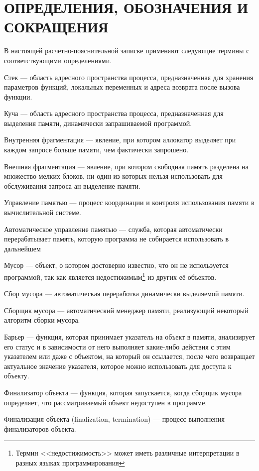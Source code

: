 \part*{ОПРЕДЕЛЕНИЯ, ОБОЗНАЧЕНИЯ И\\СОКРАЩЕНИЯ}
В настоящей расчетно-пояснительной записке применяют следующие термины с соответствующими определениями.

\begin{enumdescript}
	\item[Стек] --- область адресного пространства процесса, предназначенная для хранения параметров функций, локальных переменных и адреса возврата после вызова функции.
	\item[Куча] --- область адресного пространства процесса, предназначенная для выделения памяти, динамически запрашиваемой программой.
	\item[Внутренняя фрагментация] --- явление, при котором аллокатор выделяет при каждом запросе больше памяти, чем фактически запрошено.
	\item[Внешняя фрагментация] --- явление, при котором свободная память разделена на множество мелких блоков, ни один из которых нельзя использовать для обслуживания запроса ан выделение памяти.
	\item[Управление памятью] --- процесс координации и контроля использования памяти в вычислительной системе.
	\item[Автоматическое управление памятью] --- служба, которая автоматически перерабатывает память, которую программа не собирается использовать в дальнейшем
	\item[Мусор] --- объект, о котором достоверно известно, что он не используется программой, так как является недостижимым\footnote{Термин <<недостижимость>> может иметь различные интерпретации в разных языках программирования} из других её объектов.
	\item[Сбор мусора] --- автоматическая переработка динамически выделяемой памяти.
	\item[Сборщик мусора] --- автоматический менеджер памяти, реализующий некоторый алгоритм сборки мусора.
	\item[Барьер] --- функция, которая принимает указатель на объект в памяти, анализирует его статус и в зависимости от него выполняет какие-либо действия с этим указателем или даже с объектом, на который он ссылается, после чего возвращает актуальное значение указателя, которое можно использовать для доступа к объекту.
	\item[Финализатор объекта] --- функция, которая запускается, когда сборщик мусора определяет, что рассматриваемый объект недоступен в программе.
	\item[Финализация объекта] (finalization, termination) --- процесс выполнения финализаторов объекта.
\end{enumdescript}

